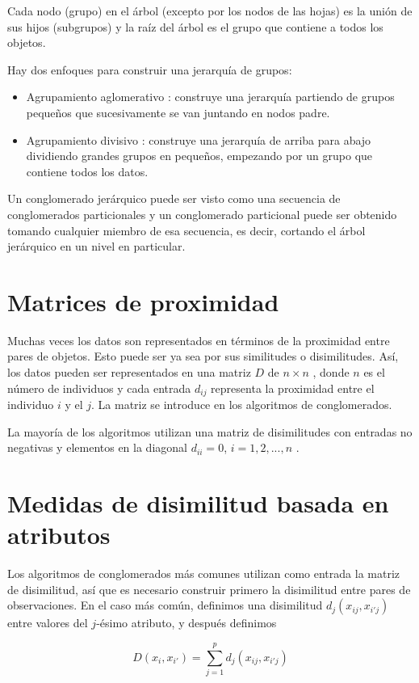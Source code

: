Cada nodo (grupo) en el árbol (excepto por los nodos de las hojas) es la unión de sus hijos (subgrupos) y la raíz del árbol es el grupo que contiene a todos los objetos. 

Hay dos enfoques para construir una jerarquía de grupos:
\begin{itemize}
  \item Agrupamiento aglomerativo : construye una jerarquía partiendo de grupos pequeños que sucesivamente se van juntando en nodos padre. 
  \item Agrupamiento divisivo : construye una jerarquía de arriba para abajo dividiendo grandes grupos en pequeños, empezando por un grupo que contiene todos los datos.
\end{itemize}

Un conglomerado jerárquico puede ser visto como una secuencia de conglomerados particionales y un conglomerado particional puede ser obtenido tomando cualquier miembro de esa secuencia, es decir, cortando el árbol jerárquico en un nivel en particular.


\section{Matrices de proximidad}
Muchas veces los datos son representados en términos de la proximidad entre pares de objetos. Esto puede ser ya sea por sus similitudes o disimilitudes. Así, los datos pueden ser representados en una matriz $D$ de $n \times n$ , donde $n$ es el número de individuos y cada entrada $d_{ij}$ representa la proximidad entre el individuo $i$ y el $j$. La matriz se introduce en los algoritmos de conglomerados.

La mayoría de los algoritmos utilizan una matriz de disimilitudes con entradas no negativas y elementos en la diagonal $d_{ii} =0 $, $i=1,2,...,n$ .


\section{Medidas de disimilitud basada en atributos}
Los algoritmos de conglomerados más comunes utilizan como entrada la matriz de disimilitud, así que es necesario construir primero la disimilitud entre pares de observaciones. En el caso más común, definimos una disimilitud $d_j(x_{ij},x_{i'j})$ entre valores del $j$-ésimo atributo, y después definimos

\begin{equation}
D(x_{i},x_{i'})= \sum_{j=1}^{p} d_{j}(x_{ij},x_{i'j})
\end{equation}

